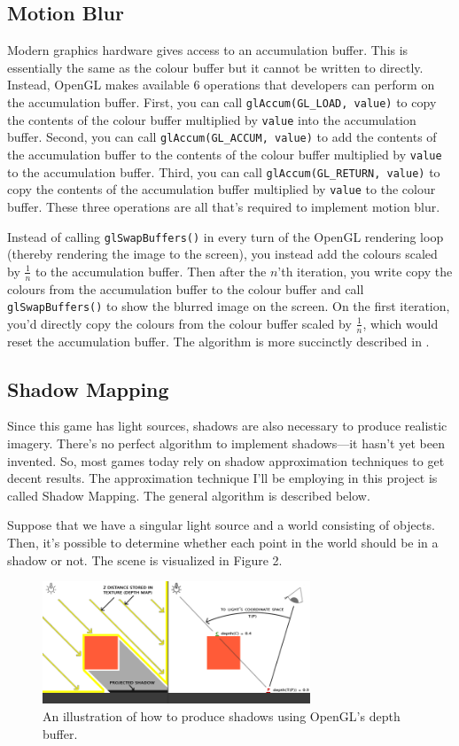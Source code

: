 \documentclass[11pt]{article}
\begin{document}
\subsection*{Motion Blur}
Modern graphics hardware gives access to an accumulation buffer. This is essentially the same as the colour buffer but it cannot be written to directly. Instead, OpenGL makes available 6 operations that developers can perform on the accumulation buffer. First, you can call \verb|glAccum(GL_LOAD, value)| to copy the contents of the colour buffer multiplied by \verb|value| into the accumulation buffer. Second, you can call \verb|glAccum(GL_ACCUM, value)| to add the contents of the accumulation buffer to the contents of the colour buffer multiplied by \verb|value| to the accumulation buffer. Third, you can call \verb|glAccum(GL_RETURN, value)| to copy the contents of the accumulation buffer multiplied by \verb|value| to the colour buffer. These three operations are all that's required to implement motion blur.

Instead of calling \verb|glSwapBuffers()| in every turn of the OpenGL rendering loop (thereby rendering the image to the screen), you instead add the colours scaled by $\frac{1}{n}$ to the accumulation buffer. Then after the $n$'th iteration, you write copy the colours from the accumulation buffer to the colour buffer and call \verb|glSwapBuffers()| to show the blurred image on the screen. On the first iteration, you'd directly copy the colours from the colour buffer scaled by $\frac{1}{n}$, which would reset the accumulation buffer. The algorithm is more succinctly described in \cite{wikibooks-motion-blur}. 

\subsection*{Shadow Mapping}
Since this game has light sources, shadows are also necessary to produce realistic imagery. There's no perfect algorithm to implement shadows---it hasn't yet been invented. So, most games today rely on shadow approximation techniques to get decent results. The approximation technique I'll be employing in this project is called Shadow Mapping. The general algorithm is described below.

Suppose that we have a singular light source and a world consisting of objects. Then, it's possible to determine whether each point in the world should be in a shadow or not. The scene is visualized in Figure 2.

\begin{figure}[H]
\includegraphics[width=8cm]{shadow_mapping_theory_spaces}
\centering
\caption{An illustration of how to produce shadows using OpenGL's depth buffer\cite{shadow-map-learn-opengl}.}
\end{figure}
\end{document}
